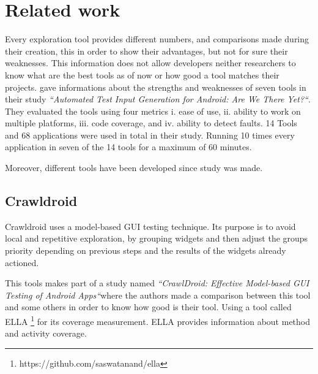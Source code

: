 
\chapter{Related work} %
\label{Chapter2} %


Every exploration tool provides different numbers, and comparisons made during their creation, this in order to show their advantages, but not for sure their weaknesses. This information does not allow developers neither researchers to know what are the best tools as of now or how good a tool matches their projects. 
\cite{Choudhary, Gorla, Orso} gave informations about the strengths and weaknesses of seven tools in their study \textit{``Automated Test Input Generation for Android: Are We There Yet?``}. They evaluated the tools using four metrics i. ease
of use, ii. ability to work on multiple platforms, iii. code coverage, and iv.
ability to detect faults. 14 Tools and 68 applications were used in total in their study. Running 10 times every application in seven of the 14 tools for a maximum of 60 minutes.

Moreover, different tools have been developed since \cite{Choudhary, Gorla, Orso} study was made.

\section{Crawldroid}\label{sec:crawldroid}

Crawldroid \cite{Cao, Yuzhong and Wu, Guoquan and Chen, Wei and Wei, Jun} uses a model-based GUI testing technique. Its purpose is to avoid local and repetitive exploration, by grouping widgets and then adjust the groups priority depending on previous steps and the results of the widgets already actioned. 

This tools makes part of a study named \textit{``CrawlDroid: Effective Model-based GUI Testing of Android Apps``}where the authors made a comparison between this tool and some others in order to know how good is their tool. Using a tool called ELLA \footnote{https://github.com/saswatanand/ella} for its coverage measurement. ELLA provides information about method and activity coverage.

